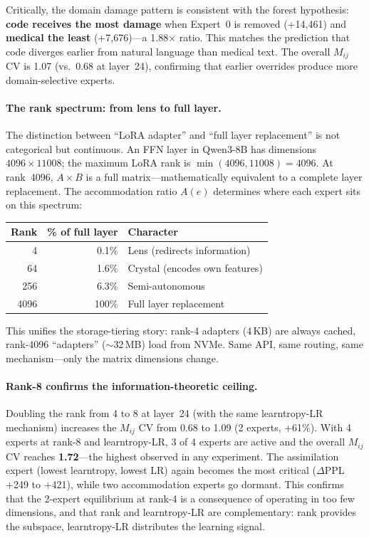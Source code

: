 \documentclass{article}
\begin{document}
Critically, the domain damage pattern is consistent with the forest
hypothesis: \textbf{code receives the most damage} when Expert~0 is removed
(+14,461) and \textbf{medical the least} (+7,676)---a 1.88$\times$ ratio.
This matches the prediction that code diverges earlier from natural language
than medical text. The overall $M_{ij}$ CV is 1.07 (vs.\ 0.68 at layer~24),
confirming that earlier overrides produce more domain-selective experts.

\paragraph{The rank spectrum: from lens to full layer.}
The distinction between ``LoRA adapter'' and ``full layer replacement'' is
not categorical but continuous. An FFN layer in Qwen3-8B has dimensions
$4096 \times 11008$; the maximum LoRA rank is $\min(4096, 11008) = 4096$. At
rank~4096, $A \times B$ is a full matrix---mathematically equivalent to a
complete layer replacement. The accommodation ratio $A(e)$ determines where
each expert sits on this spectrum:

\begin{center}
\begin{tabular}{@{}rrl@{}}
\toprule
Rank & \% of full layer & Character \\
\midrule
4 & 0.1\% & Lens (redirects information) \\
64 & 1.6\% & Crystal (encodes own features) \\
256 & 6.3\% & Semi-autonomous \\
4096 & 100\% & Full layer replacement \\
\bottomrule
\end{tabular}
\end{center}

This unifies the storage-tiering story: rank-4 adapters (4\,KB) are always
cached, rank-4096 ``adapters'' ($\sim$32\,MB) load from NVMe. Same API, same
routing, same mechanism---only the matrix dimensions change.

\paragraph{Rank-8 confirms the information-theoretic ceiling.}
Doubling the rank from 4 to 8 at layer~24 (with the same learntropy-LR
mechanism) increases the $M_{ij}$ CV from 0.68 to 1.09 (2 experts, +61\%).
With 4 experts at rank-8 and learntropy-LR, 3 of 4 experts are active and
the overall $M_{ij}$ CV reaches \textbf{1.72}---the highest observed in any
experiment. The assimilation expert (lowest learntropy, lowest LR) again
becomes the most critical ($\Delta$PPL +249 to +421), while two
accommodation experts go dormant. This confirms that the 2-expert
equilibrium at rank-4 is a consequence of operating in too few dimensions,
and that rank and learntropy-LR are complementary: rank provides the
subspace, learntropy-LR distributes the learning signal.
\end{document}
